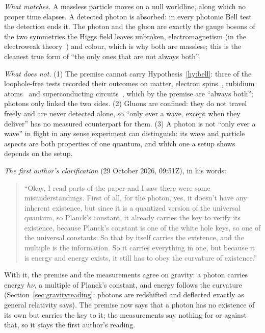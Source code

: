 \documentclass[11pt,a4paper]{article}
\theoremstyle{definition}
\theoremstyle{remark}
\begin{document}
\noindent\emph{What matches.} A massless particle moves on a null worldline, along which no proper time elapses. A detected photon is
absorbed: in every photonic Bell test the detection ends it. The photon and the gluon are exactly the gauge bosons of the two symmetries
the Higgs field leaves unbroken, electromagnetism (in the electroweak theory~\cite{weinberg}) and colour, which is why both are
massless; this is the cleanest true
form of ``the only ones that are not always both''.

\noindent\emph{What does not.} (1) The premise cannot carry Hypothesis~\ref{hy:bell}: three of the loophole-free tests recorded their
outcomes on matter, electron spins~\cite{hensen}, rubidium atoms~\cite{rosenfeld} and superconducting circuits~\cite{storz}, which by the
premise are ``always both''; photons only linked the two sides. (2) Gluons are confined: they do not travel freely and are never detected
alone, so ``only ever a wave, except when they deliver'' has no measured counterpart for them. (3) A photon is not ``only ever a wave'' in
flight in any sense experiment can distinguish: its wave and particle aspects are both properties of one quantum, and which one a setup
shows depends on the setup.

\noindent\emph{The first author's clarification} (29 October 2026, 09:51Z), in his words:

\begin{quote}
``Okay, I read parts of the paper and I saw there were some misunderstandings. First of all, for the photon, yes, it doesn't have any
inherent existence, but since it is a quantized version of the universal quantum, so Planck's constant, it already carries the key to
verify its existence, because Planck's constant is one of the white hole keys, so one of the universal constants. So that by itself
carries the existence, and the multiple is the information. So it carries everything in one, but because it is energy and energy exists,
it still has to obey the curvature of existence.''
\end{quote}

\noindent With it, the premise and the measurements agree on gravity: a photon carries energy $h\nu$, a multiple of Planck's constant, and
energy follows the curvature (Section~\ref{sec:gravityreading}: photons are redshifted and deflected exactly as general relativity says).
The premise now says that a photon has no existence of its own but carries the key to it; the measurements say nothing for or against
that, so it stays the first author's reading.
\end{document}

